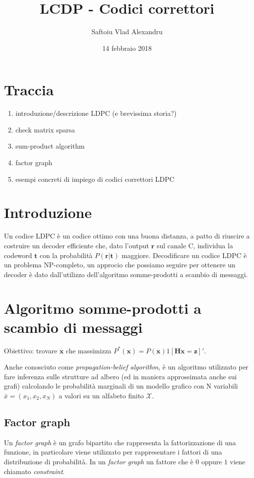 \documentclass{article}
\title{LCDP - Codici correttori}
\date{14 febbraio 2018}
\author{Saftoiu Vlad Alexandru}
\begin{document}
	\maketitle
	\newpage

	\tableofcontents
	\newpage

	\section{Traccia}
	\begin{enumerate}
		\item introduzione/descrizione LDPC (e brevissima storia?)
		\item check matrix sparsa 
		\item sum-product algorithm
		\item factor graph
		\item esempi concreti di impiego di codici correttori LDPC
	\end{enumerate}
	\section{Introduzione}
	Un codice LDPC è un codice ottimo con una buona distanza, a patto di riuscire a costruire un decoder efficiente che, dato l'output $\textbf{r}$ sul canale C, individua la codeword $\textbf{t}$ con la probabilità $P(\textbf{r}|\textbf{t})$ maggiore. Decodificare un codice LDPC è un problema NP-completo, un approcio che possiamo seguire per ottenere un decoder è dato dall'utilizzo dell'algoritmo somme-prodotti a scambio di messaggi.
	\section{Algoritmo somme-prodotti a scambio di messaggi}
Obiettivo: trovare $\textbf{x}$ che massimizza $P^*(\textbf{x})=P(\textbf{x})1[\textbf{Hx} = \textbf{z}]'$.

Anche conosciuto come \textit{propagation-belief algorithm}, è un algoritmo utilizzato per fare inferenza sulle strutture ad albero (ed in maniera approssimata anche sui grafi) calcolando le probabilità marginali di un modello grafico con N variabili $\bar{x} = (x_1,x_2, x_N)$ a valori su un alfabeto finito $\mathcal{X}$.
	\subsection{Factor graph}
	Un \textit{factor graph} è un grafo bipartito che rappresenta la fattorizzazione di una funzione, in particolare viene utilizzato per rappresentare i fattori di una distribuzione di probabilità. In un \textit{factor graph} un fattore che è $0$ oppure $1$ viene chiamato \textit{constraint}.
\end{document}
